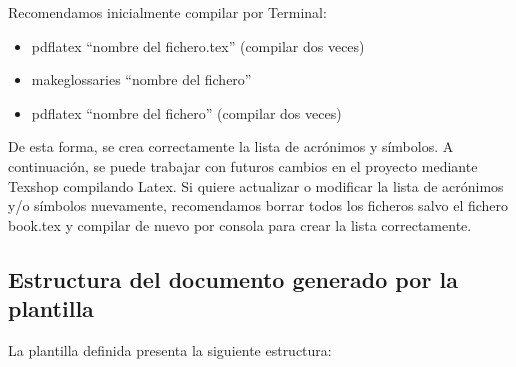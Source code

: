 \documentclass[spanish,openright]{book}
\begin{document}
Recomendamos inicialmente compilar por Terminal:

\begin{itemize}
\item pdflatex “nombre del fichero.tex” (compilar dos veces)
\item makeglossaries “nombre del fichero”
\item pdflatex “nombre del fichero” (compilar dos veces)
\end{itemize}

De esta forma, se crea correctamente la lista de acrónimos y símbolos. A
continuación, se puede trabajar con futuros cambios en el proyecto
mediante Texshop compilando Latex. Si quiere actualizar o modificar la
lista de acrónimos y/o símbolos nuevamente, recomendamos borrar todos
los ficheros salvo el fichero book.tex y compilar de nuevo por consola
para crear la lista correctamente.



\subsection{Estructura del documento generado por la plantilla}
\label{sec:estr-del-docum}

La plantilla definida presenta la siguiente estructura:
\end{document}

